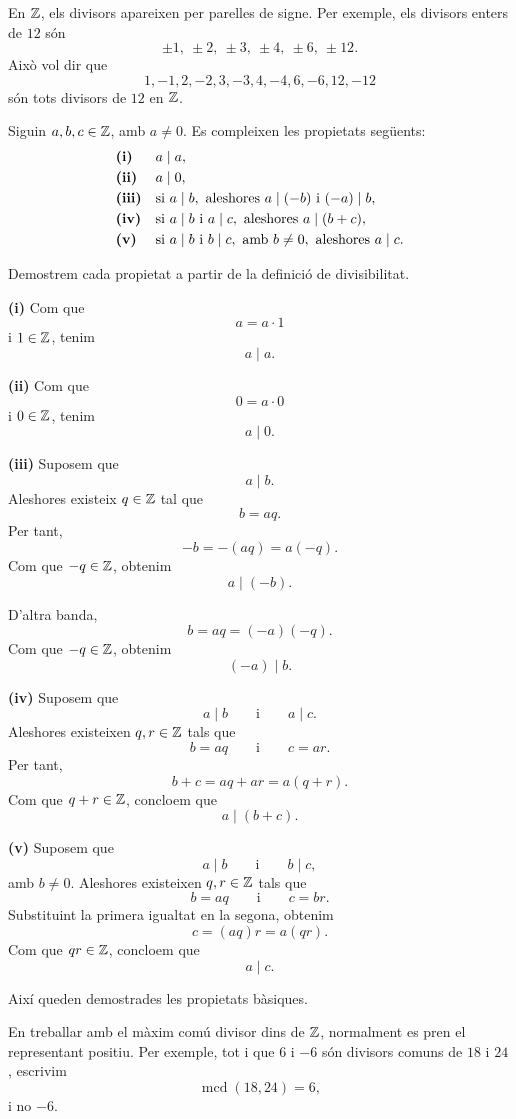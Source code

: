 \begin{observacio}
En $\mathbb{Z}$, els divisors apareixen per parelles de signe. Per exemple, els divisors enters de $12$ són
\[
\pm 1,\ \pm 2,\ \pm 3,\ \pm 4,\ \pm 6,\ \pm 12.
\]
Això vol dir que
\[
1, -1, 2, -2, 3, -3, 4, -4, 6, -6, 12, -12
\]
són tots divisors de $12$ en $\mathbb{Z}$.
\end{observacio}

\begin{proposicio}\label{prop:divisibilitat-enters}
Siguin $a,b,c\in\mathbb{Z}$, amb $a\neq 0$. Es compleixen les propietats següents:
\[
\begin{array}{ll}
\text{\textbf{(i)}} & a\mid a,\\[1mm]
\text{\textbf{(ii)}} & a\mid 0,\\[1mm]
\text{\textbf{(iii)}} & \text{si } a\mid b,\text{ aleshores } a\mid (-b) \text{ i } (-a)\mid b,\\[1mm]
\text{\textbf{(iv)}} & \text{si } a\mid b \text{ i } a\mid c,\text{ aleshores } a\mid (b+c),\\[1mm]
\text{\textbf{(v)}} & \text{si } a\mid b \text{ i } b\mid c,\text{ amb } b\neq 0,\text{ aleshores } a\mid c.
\end{array}
\]
\end{proposicio}

\begin{prova}
Demostrem cada propietat a partir de la definició de divisibilitat.

\medskip

\noindent\textbf{(i)} Com que
\[
a=a\cdot 1
\]
i $1\in\mathbb{Z}$, tenim
\[
a\mid a.
\]

\medskip

\noindent\textbf{(ii)} Com que
\[
0=a\cdot 0
\]
i $0\in\mathbb{Z}$, tenim
\[
a\mid 0.
\]

\medskip

\noindent\textbf{(iii)} Suposem que
\[
a\mid b.
\]
Aleshores existeix $q\in\mathbb{Z}$ tal que
\[
b=aq.
\]
Per tant,
\[
-b=-(aq)=a(-q).
\]
Com que $-q\in\mathbb{Z}$, obtenim
\[
a\mid (-b).
\]

D'altra banda,
\[
b=aq=(-a)(-q).
\]
Com que $-q\in\mathbb{Z}$, obtenim
\[
(-a)\mid b.
\]

\medskip

\noindent\textbf{(iv)} Suposem que
\[
a\mid b
\qquad\text{i}\qquad
a\mid c.
\]
Aleshores existeixen $q,r\in\mathbb{Z}$ tals que
\[
b=aq
\qquad\text{i}\qquad
c=ar.
\]
Per tant,
\[
b+c=aq+ar=a(q+r).
\]
Com que $q+r\in\mathbb{Z}$, concloem que
\[
a\mid (b+c).
\]

\medskip

\noindent\textbf{(v)} Suposem que
\[
a\mid b
\qquad\text{i}\qquad
b\mid c,
\]
amb $b\neq 0$.
Aleshores existeixen $q,r\in\mathbb{Z}$ tals que
\[
b=aq
\qquad\text{i}\qquad
c=br.
\]
Substituint la primera igualtat en la segona, obtenim
\[
c=(aq)r=a(qr).
\]
Com que $qr\in\mathbb{Z}$, concloem que
\[
a\mid c.
\]

Així queden demostrades les propietats bàsiques.
\end{prova}

\begin{observacio}
En treballar amb el màxim comú divisor dins de $\mathbb{Z}$, normalment es pren el representant positiu. Per exemple, tot i que $6$ i $-6$ són divisors comuns de $18$ i $24$, escrivim
\[
\operatorname{mcd}(18,24)=6,
\]
i no $-6$.
\end{observacio}
